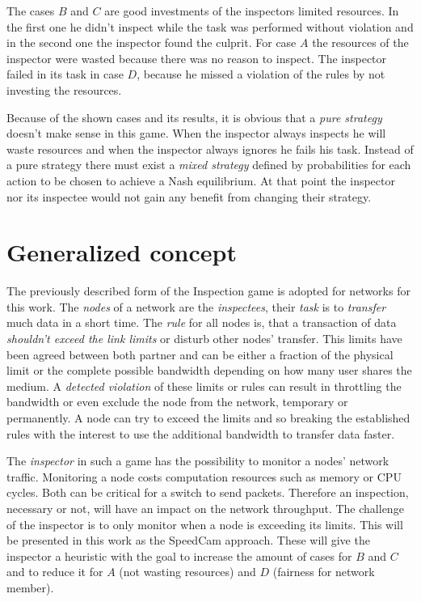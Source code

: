 \documentclass[thesis.tex]{subfiles}
\begin{document}
The cases $B$ and $C$ are good investments of the inspectors limited resources. In the first one he didn't inspect while the task was performed without violation and in the second one the inspector found the culprit. For case $A$ the resources of the inspector were wasted because there was no reason to inspect. The inspector failed in its task in case $D$, because he missed a violation of the rules by not investing the resources.

Because of the shown cases and its results, it is obvious that a \textit{pure strategy} doesn't make sense in this game. When the inspector always inspects he will waste resources and when the inspector always ignores he fails his task. Instead of a pure strategy there must exist a \textit{mixed strategy} defined by probabilities for each action to be chosen to achieve a Nash equilibrium. At that point the inspector nor its inspectee would not gain any benefit from changing their strategy.\cite{nash1950equilibrium}


\section {Generalized concept} \label{sec:main:generalconcept}
The previously described form of the Inspection game is adopted for networks for this work. The \textit{nodes} of a network are the \textit{inspectees}, their \textit{task} is to \textit{transfer} much data in a short time. The \textit{rule} for all nodes is, that a transaction of data \textit{shouldn't exceed the link limits} or disturb other nodes' transfer. This limits have been agreed between both partner and can be either a fraction of the physical limit or the complete possible bandwidth depending on how many user shares the medium. A \textit{detected violation} of these limits or rules can result in throttling the bandwidth or even exclude the node from the network, temporary or permanently. A node can try to exceed the limits and so breaking the established rules with the interest to use the additional bandwidth to transfer data faster.

The \textit{inspector} in such a game has the possibility to monitor a nodes' network traffic. Monitoring a node costs computation resources such as memory or CPU cycles. Both can be critical for a switch to send packets. Therefore an inspection, necessary or not, will have an impact on the network throughput. The challenge of the inspector is to only monitor when a node is exceeding its limits. This will be presented in this work as the SpeedCam approach. These will give the inspector a heuristic with the goal to increase the amount of cases for $B$ and $C$ and to reduce it for $A$ (not wasting resources) and $D$ (fairness for network member).
\end{document}

